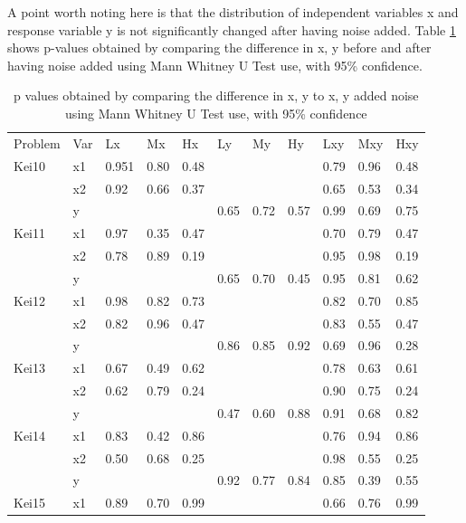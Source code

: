A point worth noting here is that the distribution of independent variables x and response variable y is not significantly changed after having noise added. Table \ref{tab:pvalueNoise} shows p-values obtained by comparing the difference in x, y before and after having noise added using Mann Whitney U Test use, with 95\% confidence. %

\begin{table}
\caption{p values obtained by comparing the difference in x, y to x, y added noise using Mann Whitney U Test use, with 95\% confidence}
\label{tab:pvalueNoise}       %
\begin{tabular}{lllllllllll}
\hline\noalign{\smallskip}
Problem & Var & Lx & Mx & Hx & Ly & My & Hy & Lxy & Mxy & Hxy \\
\noalign{\smallskip}\hline\noalign{\smallskip}
Kei10 & x1 & 0.951 & 0.80 & 0.48 &  &  &  & 0.79 & 0.96 & 0.48 \\
& x2 & 0.92 & 0.66 & 0.37 & & & & 0.65 & 0.53 & 0.34 \\
& y &  & & & 0.65 & 0.72 & 0.57 & 0.99 & 0.69 & 0.75 \\
Kei11 & x1 & 0.97 & 0.35 & 0.47 & &  &  & 0.70 & 0.79 & 0.47 \\
& x2 & 0.78 & 0.89 & 0.19 &  &  & & 0.95 & 0.98 & 0.19 \\
& y & & & & 0.65 & 0.70 & 0.45 & 0.95 & 0.81 & 0.62 \\
Kei12 & x1 & 0.98 & 0.82 & 0.73 & & & & 0.82 & 0.70 & 0.85 \\
& x2 & 0.82 & 0.96 & 0.47 &  &  & & 0.83 & 0.55 & 0.47 \\
& y & & & & 0.86 & 0.85 & 0.92 & 0.69 & 0.96 & 0.28 \\
Kei13 & x1 & 0.67 & 0.49 & 0.62 & & & & 0.78 & 0.63 & 0.61 \\
& x2 & 0.62 & 0.79 & 0.24 & & & & 0.90 & 0.75 & 0.24 \\
& y & & & & 0.47 & 0.60 & 0.88 & 0.91 & 0.68 & 0.82 \\
Kei14 & x1 & 0.83 & 0.42 & 0.86 & & & & 0.76 & 0.94 & 0.86 \\
& x2 & 0.50 & 0.68 & 0.25 & & & & 0.98 & 0.55 & 0.25 \\
& y & & & & 0.92 & 0.77 & 0.84 & 0.85 & 0.39 & 0.55 \\
Kei15 & x1 & 0.89 & 0.70 & 0.99 & & & & 0.66 & 0.76 & 0.99 \\

\end{tabular}
\end{table}
